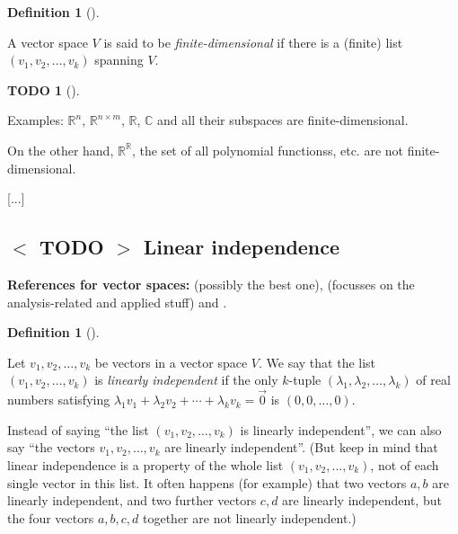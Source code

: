 \documentclass[numbers=enddot,12pt,final,onecolumn,notitlepage]{scrartcl}%
\theoremstyle{definition}
\newtheorem{defi}[theo]{Definition}
\newenvironment{definition}[1][]
{\begin{defi}[#1]\begin{leftbar}}
{\end{leftbar}\end{defi}}
\newtheorem{quest}[theo]{TODO}
\newenvironment{todo}[1][]
{\begin{quest}[#1]\begin{leftbar}}
{\end{leftbar}\end{quest}}
\begin{document}
\begin{definition}
A vector space $V$ is said to be \textit{finite-dimensional} if there is a
(finite) list $\left(  v_{1},v_{2},\ldots,v_{k}\right)  $ spanning $V$.
\end{definition}

\begin{todo}
Examples: $\mathbb{R}^{n}$, $\mathbb{R}^{n\times m}$, $\mathbb{R}$,
$\mathbb{C}$ and all their subspaces are finite-dimensional.

On the other hand, $\mathbb{R}^{\mathbb{R}}$, the set of all polynomial
functionss, etc. are not finite-dimensional.
\end{todo}

[...]

\subsection{%
$<$%
TODO%
$>$
Linear independence}

\textbf{References for vector spaces:} \cite[\S 5.2]{LaNaSc16} (possibly the
best one), \cite[\S 2.3]{OlvSha06} (focusses on the analysis-related and
applied stuff) and \cite[Two.II]{Heffer16}.

\begin{definition}
\label{def.linind}Let $v_{1},v_{2},\ldots,v_{k}$ be vectors in a vector space
$V$. We say that the list $\left(  v_{1},v_{2},\ldots,v_{k}\right)  $ is
\textit{linearly independent} if the only $k$-tuple $\left(  \lambda
_{1},\lambda_{2},\ldots,\lambda_{k}\right)  $ of real numbers satisfying
$\lambda_{1}v_{1}+\lambda_{2}v_{2}+\cdots+\lambda_{k}v_{k}=\overrightarrow{0}$
is $\left(  0,0,\ldots,0\right)  $.

Instead of saying \textquotedblleft the list $\left(  v_{1},v_{2},\ldots
,v_{k}\right)  $ is linearly independent\textquotedblright, we can also say
\textquotedblleft the vectors $v_{1},v_{2},\ldots,v_{k}$ are linearly
independent\textquotedblright. (But keep in mind that linear independence is a
property of the whole list $\left(  v_{1},v_{2},\ldots,v_{k}\right)  $, not of
each single vector in this list. It often happens (for example) that two
vectors $a,b$ are linearly independent, and two further vectors $c,d$ are
linearly independent, but the four vectors $a,b,c,d$ together are not linearly independent.)
\end{definition}
\end{document}
